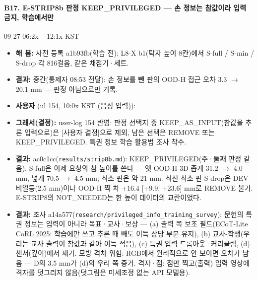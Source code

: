 \paragraph{B17. E-STRIP8b 판정 KEEP\_PRIVILEGED --- 손 정보는 참값이라 입력 금지, 학습에서만}
{\small 09-27 06:2x -- 12:1x KST}
\begin{itemize}
  \item \textbf{해 봄:} 사전 등록 a1b93fb(학습 전): L8-X b1(탁자 높이 8칸)에서 S-full / S-min / S-drop 각 816걸음, 같은 채점기·세트.
  \item \textbf{결과:} 중간(통제자 08:53 전달): 손 정보를 뺀 판의 OOD-H 접근 오차 3.3 $\rightarrow$ 20.1 mm --- 판정 아님으로만 기록.
  \item \textbf{사용자} (ul 154, 10:0x KST (음성 입력)): 
  \item \textbf{그래서(결정):} user-log 154 반영: 판정 선택지 중 KEEP\_AS\_INPUT(참값을 추론 입력으로)은 [사용자 결정]으로 제외, 남은 선택은 REMOVE 또는 KEEP\_PRIVILEGED. 특권 정보 학습 활용법 조사 착수.
  \item \textbf{결과:} ac0c1cc(\texttt{results/\allowbreak{}strip8b.\allowbreak{}md}): KEEP\_PRIVILEGED(주·둘째 판정 같음). S-full은 이제 요청의 참 높이를 쓴다 --- 옛 OOD-H 3D 좁게 31.2 $\rightarrow$ 4.0 mm, 넓게 70.5 $\rightarrow$ 4.5 mm; 최소 판은 약 21 mm. 최선 최소 판 S-drop은 DEV 비열등(2.5 mm)이나 OOD-H 짝 차 +16.4 [+9.9, +23.6] mm로 REMOVE 불가. E-STRIP8의 NOT\_NEEDED는 한 높이 데이터의 교란이었다.
  \item \textbf{결과:} 조사 a14a577(\texttt{research/\allowbreak{}privileged\_\allowbreak{}info\_\allowbreak{}training\_\allowbreak{}survey}): 문헌의 특권 정보는 입력이 아니라 목표·교사·보상 --- (a) 출력 쪽 보조 필드(ECoT-Lite CoRL 2025: 학습에만 쓰고 추론 때 빼도 이득 상당 부분 유지), (b) 교사-학생(우리는 교사 출력이 참값과 같아 이득 적음), (c) 특권 입력 드롭아웃·커리큘럼, (d) 센서(깊이)에서 재기. 모방 격차 위험: RGB에서 원리적으로 안 보이면 오차가 남음 --- D의 3.5 mm가 (d)의 우리 쪽 증거. 격자·점: 점만 찍고(출력) 입력 영상에 격자를 덧그리지 않음(덧그림은 미세조정 없는 API 모델용).

\end{itemize}
